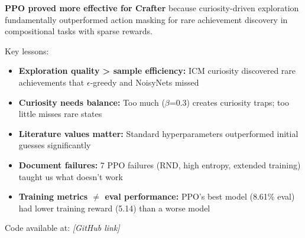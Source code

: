 \documentclass[conference]{IEEEtran}
\begin{document}
\textbf{PPO proved more effective for Crafter} because curiosity-driven exploration fundamentally outperformed action masking for rare achievement discovery in compositional tasks with sparse rewards.

Key lessons:
\begin{itemize}
    \item \textbf{Exploration quality > sample efficiency:} ICM curiosity discovered rare achievements that $\epsilon$-greedy and NoisyNets missed
    \item \textbf{Curiosity needs balance:} Too much ($\beta$=0.3) creates curiosity traps; too little misses rare states
    \item \textbf{Literature values matter:} Standard hyperparameters outperformed initial guesses significantly
    \item \textbf{Document failures:} 7 PPO failures (RND, high entropy, extended training) taught us what doesn't work
    \item \textbf{Training metrics $\neq$ eval performance:} PPO's best model (8.61\% eval) had lower training reward (5.14) than a worse model
\end{itemize}

Code available at: \textit{[GitHub link]}
\end{document}
